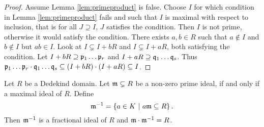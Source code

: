 \begin{proof}
Assume Lemma \ref{lem:primeproduct} is false. Choose $ I $ for which condition in Lemma \ref{lem:primeproduct} fails and such that $ I $ is maximal with respect to inclusion, that is for all $ J \supseteq I $, $ J $ satisfies the condition. Then $ I $ is not prime, otherwise it would satisfy the condition. There exists $ a, b \in R $ such that $ a \notin I $ and $ b \notin I $ but $ ab \in I $. Look at $ I \subsetneq I + bR $ and $ I \subsetneq I + aR $, both satisfying the condition. Let $ I + bR \supseteq \mathfrak{p}_1 \dots \mathfrak{p}_r $ and $ I + aR \supseteq \mathfrak{q}_1 \dots \mathfrak{q}_s $. Thus $ \ppp_1 \dots \ppp_r \cdot \qqq_1 \dots \qqq_s \subseteq \br{I + bR} \cdot \br{I + aR} \subseteq I $.
\end{proof}


\begin{proposition}
\label{prop:inverse}
Let $ R $ be a Dedekind domain. Let $ \mathfrak{m} \subsetneq R $ be a non-zero prime ideal, if and only if a maximal ideal of $ R $. Define
$$ \mmm^{-1} = \cbr{a \in K \st a\mmm \subseteq R}. $$
Then $ \mathfrak{m}^{-1} $ is a fractional ideal of $ R $ and $ \mathfrak{m} \cdot \mathfrak{m}^{-1} = R $.
\end{proposition}

